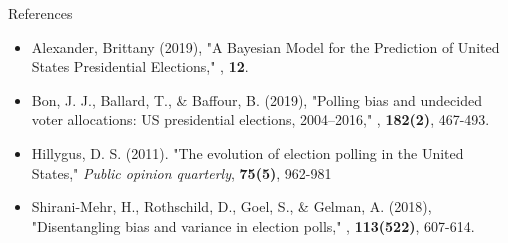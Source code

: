 \documentclass{beamer}\usepackage[]{graphicx}\usepackage[]{color}
\begin{document}
\begin{frame}{References}
\begin{itemize}
\item Alexander, Brittany (2019), "A Bayesian Model for the Prediction of United States Presidential Elections," , \textbf{12}. 
\item Bon, J. J., Ballard, T., \& Baffour, B. (2019), "Polling bias and undecided voter allocations: US presidential elections, 2004–2016," , \textbf{182(2)}, 467-493.
\item Hillygus, D. S. (2011). "The evolution of election polling in the United States," \textit{Public opinion quarterly}, \textbf{75(5)}, 962-981
\item Shirani-Mehr, H., Rothschild, D., Goel, S., \& Gelman, A. (2018), "Disentangling bias and variance in election polls," , \textbf{113(522)}, 607-614.
\end{itemize}
\end{frame}
\end{document}
